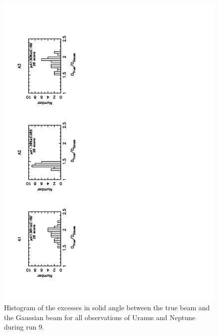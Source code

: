 \begin{figure}
\begin{center}
  \includegraphics[clip, angle=-90, scale=0.6]{Figures/TG_hist_Ura_Nep_run9_28scan.pdf}
  \caption{Histogram of the excesses in solid angle between the true beam and the Gaussian beam for all
   observations of Uranus and Neptune during run 9.}
\label{hist:excesses}
\end{center}
\end{figure}


